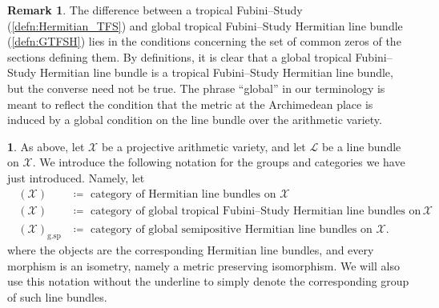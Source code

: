 \documentclass[11pt,reqno]{amsart}
\newcommand{\mC}{\mathbb{C}}
\newcommand{\cX}{\mathcal{X}}
\newcommand{\cL}{\mathcal{L}}
\newcommand{\CITE}{{\color{red}\textsf{CITE}}}
\newcommand{\jax}[1]{{\color{cyan} \sf $\clubsuit\clubsuit\clubsuit$ Jackson: [#1] $\clubsuit\clubsuit\clubsuit$}}
\theoremstyle{theorem}
\numberwithin{equation}{subsection}
\numberwithin{equation}{subsection}
\theoremstyle{definition}
\newtheorem{notation}[subsubsection]{\text{Notation}}
\newtheorem{remark}[subsubsection]{Remark}
\theoremstyle{remark}
\numberwithin{equation}{subsubsection} \numberwithin{figure}{section}
\DeclareMathOperator{\acPic}{\widehat{\underline{Pic}}}
\DeclareMathOperator{\tFS}{FS^{\tau}}
\DeclareMathOperator{\gtFS}{g.FS^{\tau}}
\DeclareMathOperator{\semip}{sp}
\DeclareMathOperator{\gsemip}{g.sp}
\begin{document}
\begin{remark}
The difference between a tropical Fubini--Study (\autoref{defn:Hermitian_TFS}) and global tropical Fubini--Study Hermitian line bundle (\autoref{defn:GTFSH}) lies in the conditions concerning the set of common zeros of the sections defining them.  
By definitions, it is clear that a global tropical Fubini--Study Hermitian line bundle is a tropical Fubini--Study Hermitian line bundle, but the converse need not be true.  
The phrase ``global'' in our terminology is meant to reflect the condition that the metric at the Archimedean place is induced by a global condition on the line bundle over the arithmetic variety. 
\end{remark}

%

\begin{notation}
As above, let $\cX$ be a projective arithmetic variety, and let $\cL$ be a line bundle on $\cX$. 
We introduce the following notation for the groups and categories we have just introduced. 
Namely, let  
\begin{align*}
\acPic(\cX) &\coloneqq \text{ category of Hermitian line bundles on $\cX$}\\
\acPic(\cX)_{\gtFS} &\coloneqq \text{ category of global tropical Fubini--Study Hermitian line bundles on $\cX$} \\
\acPic(\cX)_{\gsemip} &\coloneqq \text{ category of global semipositive Hermitian line bundles on $\cX$}. 
\end{align*}
where the objects are the corresponding Hermitian line bundles, and every morphism is an isometry, namely a metric preserving isomorphism. 
We will also use this notation without the underline to simply denote the corresponding group of such line bundles. 
\end{notation}
\end{document}
